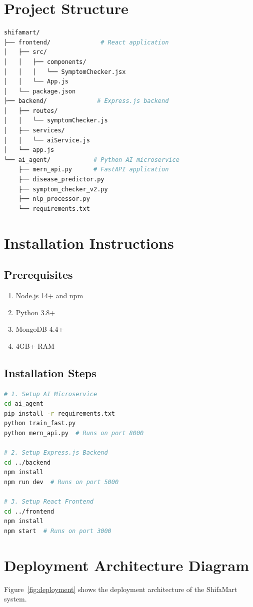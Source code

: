 \documentclass[12pt,a4paper]{article}
\begin{document}
\section{Project Structure}
\begin{lstlisting}[language=bash, caption=Complete Project Structure]
shifamart/
├── frontend/              # React application
│   ├── src/
│   │   ├── components/
│   │   │   └── SymptomChecker.jsx
│   │   └── App.js
│   └── package.json
├── backend/              # Express.js backend
│   ├── routes/
│   │   └── symptomChecker.js
│   ├── services/
│   │   └── aiService.js
│   └── app.js
└── ai_agent/            # Python AI microservice
    ├── mern_api.py      # FastAPI application
    ├── disease_predictor.py
    ├── symptom_checker_v2.py
    ├── nlp_processor.py
    └── requirements.txt
\end{lstlisting}

\section{Installation Instructions}
\subsection{Prerequisites}
\begin{enumerate}
    \item Node.js 14+ and npm
    \item Python 3.8+
    \item MongoDB 4.4+
    \item 4GB+ RAM
\end{enumerate}

\subsection{Installation Steps}
\begin{lstlisting}[language=bash, caption=Installation Commands]
# 1. Setup AI Microservice
cd ai_agent
pip install -r requirements.txt
python train_fast.py
python mern_api.py  # Runs on port 8000

# 2. Setup Express.js Backend
cd ../backend
npm install
npm run dev  # Runs on port 5000

# 3. Setup React Frontend
cd ../frontend
npm install
npm start  # Runs on port 3000
\end{lstlisting}

\section{Deployment Architecture Diagram}
Figure~\ref{fig:deployment} shows the deployment architecture of the ShifaMart system.
\end{document}
